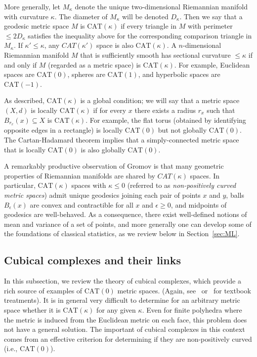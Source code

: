 \documentclass[a4paper,11pt]{article}
\newcommand{\CAT}{\textrm{CAT}}
\begin{document}
More generally, let $M_{\kappa}$ denote the unique two-dimensional Riemannian manifold with curvature $\kappa$.
The diameter of $M_{\kappa}$ will be denoted $D_{\kappa}$.
Then we say that a geodesic metric space $M$ is $\CAT(\kappa)$ if every triangle in $M$ with perimeter $\leq 2D_{\kappa}$ satisfies the inequality above for the corresponding comparison triangle in $M_{\kappa}$.
If $\kappa' \leq \kappa$, any $CAT(\kappa')$ space is also $\CAT(\kappa)$.
A $n$-dimensional Riemannian manifold $M$ that is sufficiently smooth has sectional curvature $\leq \kappa$ if and only if $M$ (regarded as a metric space) is $\CAT(\kappa)$.
For example, Euclidean spaces are $\CAT(0)$, spheres are $\CAT(1)$, and hyperbolic spaces are $\CAT(-1)$.

As described, $\CAT(\kappa)$ is a global condition; we will say that a metric space $(X,d)$ is locally $\CAT(\kappa)$ if for every $x$ there exists a radius $r_x$ such that $B_{r_x}(x) \subseteq X$ is $\CAT(\kappa)$.
For example, the flat torus (obtained by identifying opposite edges in a rectangle) is locally $\CAT(0)$ but not globally $\CAT(0)$.
The Cartan-Hadamard theorem implies that a simply-connected metric space that is locally $\CAT(0)$ is also globally $\CAT(0)$.

A remarkably productive observation of Gromov is that many geometric properties of Riemannian manifolds are shared by $CAT(\kappa)$ spaces.
In particular, $\CAT(\kappa)$ spaces with $\kappa \leq 0$ (referred to as {\em non-positively curved metric spaces}) admit unique geodesics joining each pair of points $x$ and $y$, balls $B_{\epsilon}(x)$ are convex and contractible for all $x$ and $\epsilon \geq 0$, and midpoints of geodesics are well-behaved.
As a consequence, there exist well-defined notions of mean and variance of a set of points, and more generally one can develop some of the foundations of classical statistics, as we review below in Section~\ref{sec:ML}.

\subsection{Cubical complexes and their links}

In this subsection, we review the theory of cubical complexes, which
provide a rich source of examples of $\CAT(0)$ metric spaces.  (Again, see~\cite{burago01} or~\cite{bridson99} for textbook treatments).  It is
in general very difficult to determine for an arbitrary metric space
whether it is $\CAT(\kappa)$ for any given $\kappa$.  Even for finite
polyhedra where the metric is induced from the Euclidean metric on
each face, this problem does not have a general solution.  The
important of cubical complexes in this context comes from an effective
criterion for determining if they are non-positively curved (i.e., $\CAT(0)$).
\end{document}
